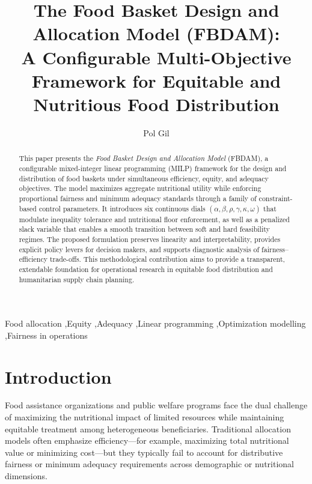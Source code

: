 \documentclass[preprint,12pt]{elsarticle}
\begin{document}
\begin{frontmatter}

\title{The Food Basket Design and Allocation Model (FBDAM):\\
A Configurable Multi-Objective Framework for Equitable and Nutritious Food Distribution}

\author{Pol Gil}
\address{Zero Hunger Lab, Tilburg University, The Netherlands\\
\texttt{pol.gil@tilburguniversity.edu}}

\begin{abstract}
This paper presents the \emph{Food Basket Design and Allocation Model} (FBDAM), a configurable mixed-integer linear programming (MILP) framework for the design and distribution of food baskets under simultaneous efficiency, equity, and adequacy objectives. The model maximizes aggregate nutritional utility while enforcing proportional fairness and minimum adequacy standards through a family of constraint-based control parameters. It introduces six continuous dials $(\alpha, \beta, \rho, \gamma, \kappa, \omega)$ that modulate inequality tolerance and nutritional floor enforcement, as well as a penalized slack variable that enables a smooth transition between soft and hard feasibility regimes. The proposed formulation preserves linearity and interpretability, provides explicit policy levers for decision makers, and supports diagnostic analysis of fairness--efficiency trade-offs. This methodological contribution aims to provide a transparent, extendable foundation for operational research in equitable food distribution and humanitarian supply chain planning.
\end{abstract}

\begin{keyword}
Food allocation \sep Equity \sep Adequacy \sep Linear programming \sep Optimization modelling \sep Fairness in operations
\end{keyword}

\end{frontmatter}

\section{Introduction}
Food assistance organizations and public welfare programs face the dual challenge of maximizing the nutritional impact of limited resources while maintaining equitable treatment among heterogeneous beneficiaries. Traditional allocation models often emphasize efficiency---for example, maximizing total nutritional value or minimizing cost---but they typically fail to account for distributive fairness or minimum adequacy requirements across demographic or nutritional dimensions. 
\end{document}

